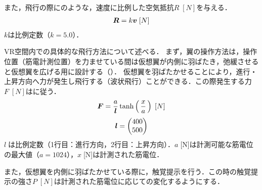         また，飛行の際にのような，速度に比例した空気抵抗$R\;[N]$を与える．
        \begin{eqnarray}
                \equlabel{air_resistance}
                \bm{R}=k\bm{v} \;[N]
        \end{eqnarray}
        $k$は比例定数（$k=5.0$）．


        VR空間内での具体的な飛行方法について述べる．
        まず，翼の操作方法は，操作位置（筋電計測位置）を力ませている間は仮想翼が内側に羽ばたき，弛緩させると仮想翼を広げる用に設計する（）．
        仮想翼を羽ばたかせることにより，進行・上昇方向へ力が発生し飛行する（波状飛行\cite{bird-flying}）ことができる．この際発生する力$F\;[N]$はに従う．
        \begin{eqnarray}
                \equlabel{force}
                \bm{F}=\frac{a}{\bm{l}}  \tanh\left(\,\frac{x}{a}\,\right) \;[N]
        \end{eqnarray}
        \begin{eqnarray}
                \equlabel{force_prop}
                \bm{l}=\begin{pmatrix}400 \\ 500 \end{pmatrix}
        \end{eqnarray}
        $l\;$は比例定数（1行目：進行方向，2行目：上昇方向）．$a\;$[N]は計測可能な筋電位の最大値（$a=1024$），$x\;$[N]は計測された筋電位．

        また，仮想翼を内側に羽ばたかせている際に，触覚提示を行う．この時の触覚提示の強さ$P\;[N]$は計測された筋電位に応じての変化するようにする．
        
